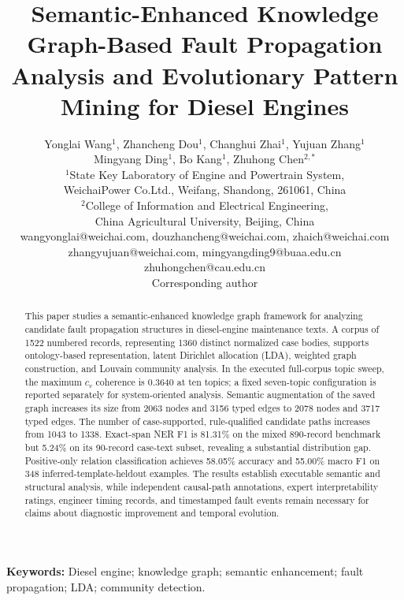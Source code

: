 \documentclass[
aps,%
12pt,%
final,%
notitlepage,%
oneside,%
onecolumn,%
nobibnotes,%
nofootinbib,%
superscriptaddress,%
noshowpacs,%
centertags]%
{revtex4}
\begin{document}

\title{Semantic-Enhanced Knowledge Graph-Based Fault Propagation Analysis and Evolutionary Pattern Mining for Diesel Engines}

\author{%
    Yonglai Wang$^{1}$, Zhancheng Dou$^{1}$,
    Changhui Zhai$^{1}$, Yujuan Zhang$^{1}$\\
    Mingyang Ding$^{1}$, Bo Kang$^{1}$,
    Zhuhong Chen$^{2,*}$\\[0.4em]
    \normalsize $^{1}$State Key Laboratory of Engine and Powertrain System,\\
    \normalsize WeichaiPower Co.Ltd., Weifang, Shandong, 261061, China\\
    \normalsize $^{2}$College of Information and Electrical Engineering,\\
    \normalsize China Agricultural University, Beijing, China\\
    \normalsize wangyonglai@weichai.com, douzhancheng@weichai.com,
    zhaich@weichai.com\\
    \normalsize zhangyujuan@weichai.com, mingyangding9@buaa.edu.cn\\
    \normalsize zhuhongchen@cau.edu.cn\\
    \normalsize *Corresponding author
}

\begin{abstract}
This paper studies a semantic-enhanced knowledge graph framework for analyzing candidate fault propagation structures in diesel-engine maintenance texts. A corpus of 1522 numbered records, representing 1360 distinct normalized case bodies, supports ontology-based representation, latent Dirichlet allocation (LDA), weighted graph construction, and Louvain community analysis. In the executed full-corpus topic sweep, the maximum $c_v$ coherence is 0.3640 at ten topics; a fixed seven-topic configuration is reported separately for system-oriented analysis. Semantic augmentation of the saved graph increases its size from 2063 nodes and 3156 typed edges to 2078 nodes and 3717 typed edges. The number of case-supported, rule-qualified candidate paths increases from 1043 to 1338. Exact-span NER F1 is 81.31\% on the mixed 890-record benchmark but 5.24\% on its 90-record case-text subset, revealing a substantial distribution gap. Positive-only relation classification achieves 58.05\% accuracy and 55.00\% macro F1 on 348 inferred-template-heldout examples. The results establish executable semantic and structural analysis, while independent causal-path annotations, expert interpretability ratings, engineer timing records, and timestamped fault events remain necessary for claims about diagnostic improvement and temporal evolution.
\end{abstract}
\maketitle
\noindent\textbf{Keywords:} Diesel engine; knowledge graph; semantic enhancement; fault propagation; LDA; community detection.
\end{document}
